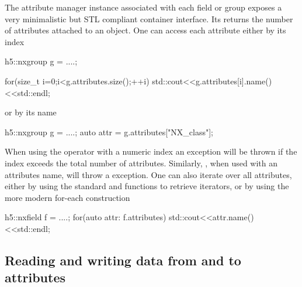 The attribute manager instance associated with each field or group exposes a
very minimalistic but STL compliant container interface. 
Its  returns the number of attributes attached to an object. 
One can access each attribute either by its index
\begin{cppcode}
h5::nxgroup g = ....;

for(size_t i=0;i<g.attributes.size();++i) 
    std::cout<<g.attributes[i].name()<<std::endl;
\end{cppcode}
or by its name
\begin{cppcode}
h5::nxgroup g = ....;
auto attr = g.attributes["NX_class"];
\end{cppcode}
When using the \cpp{[]} operator with a numeric index an 
exception will be thrown if the index exceeds the total number of attributes. 
Similarly, \cpp{[]}, when used with an attributes name, will throw a
 exception.
One can also iterate over all attributes, either by using the standard 
 and  functions to retrieve iterators, or by using the
more modern for-each construction
\begin{cppcode}
h5::nxfield f = ....;
for(auto attr: f.attributes)
    std::cout<<attr.name()<<std::endl;
\end{cppcode}


\subsection{Reading and writing data from and to attributes}

